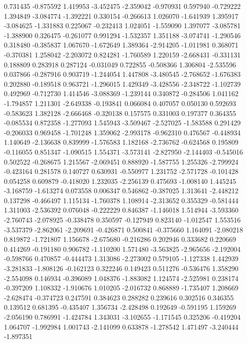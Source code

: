 0.731435
-0.875592
1.419953
-3.452475
-2.359042
-0.970931
0.597940
-0.729222
1.394849
-3.084774
-1.392221
0.330154
-0.266613
1.026070
-1.641939
1.395917
-3.084625
-1.331883
0.225067
-0.232413
1.024051
-1.559090
1.397077
-3.085781
-1.388900
0.326475
-0.261077
0.991294
-1.532357
1.351188
-3.074741
-1.290546
0.318480
-0.385837
1.067670
-1.672649
1.389364
-2.914205
-1.011981
0.368071
-0.370381
1.258042
-2.203072
0.824281
-1.760589
1.220159
-2.668431
-0.331131
0.188809
0.283918
0.287124
-0.031049
0.722855
-0.508366
1.306804
-2.535596
0.037866
-0.287916
0.903719
-1.244054
1.447808
-3.480545
-2.768652
-1.676383
0.202880
-0.189518
0.963721
-1.296015
1.429349
-3.428556
-2.348722
-1.102739
0.492969
-0.712730
1.414546
-3.088369
-1.239144
0.340872
-0.284506
1.041162
-1.794857
1.211301
-2.649338
-0.193841
0.066084
0.407057
0.050130
0.592693
-0.583623
1.382128
-2.666468
-0.320138
0.157575
0.331003
0.197377
0.364355
-0.085534
0.872358
-1.277093
1.545943
-3.509467
-2.527025
-1.583588
0.291429
-0.206033
0.969458
-1.701248
1.359062
-2.993178
-0.962310
0.476567
-0.448934
1.140649
-2.136638
0.839999
-1.576583
1.182168
-2.736762
-0.624568
0.195809
-0.116055
0.851347
-1.090515
1.554371
-3.573141
-2.827950
-2.144403
-0.545016
0.502522
-0.268675
1.215567
-2.069451
0.888920
-1.587755
1.255326
-2.799924
-0.423164
0.281578
0.140727
0.630931
-0.550977
1.231752
-2.571728
-0.101428
0.054258
0.609879
-0.418020
1.232035
-2.256139
0.475693
-1.008140
1.445245
-3.168759
-1.613274
0.073558
0.006347
0.546862
-0.387025
1.313641
-2.448212
0.137298
-0.466497
1.115134
-1.760378
1.108914
-2.313652
0.355329
-0.581444
1.311003
-2.536392
0.076048
-0.222229
0.846387
-1.146018
1.514944
-3.593360
-2.760743
-2.078925
-0.338478
0.350597
-0.127949
0.823140
-1.012547
1.553516
-3.537379
-2.862061
-2.209691
-0.426871
0.500841
-0.375660
1.164091
-2.080218
0.819872
-1.721807
1.156678
-2.675680
-0.216286
0.202946
0.333682
0.220669
0.414269
-0.191180
0.906782
-1.110200
1.571480
-3.563825
-2.965656
-2.192004
-0.598766
0.470857
-0.444473
1.313086
-2.273002
0.579105
-1.127338
1.442939
-3.281833
-1.808126
-0.162123
0.322246
0.149423
0.511276
-0.536476
1.358290
-2.554098
0.146934
-0.396089
1.048376
-1.883082
1.124574
-2.525981
0.238174
-0.397209
1.108332
-1.910676
1.010205
-2.016732
0.868889
-1.735407
1.208669
-2.628474
-0.374723
0.247591
0.384623
0.288282
0.239616
0.302516
0.346355
0.139512
0.681395
-0.435407
1.356734
-2.428498
0.192649
-0.591195
1.159269
-2.056190
0.786991
-1.424784
1.343031
-3.102655
-1.171545
0.325206
-0.419204
1.064707
-1.992984
1.001743
-2.141099
0.633878
-1.278542
1.471497
-3.240444
-1.897351
